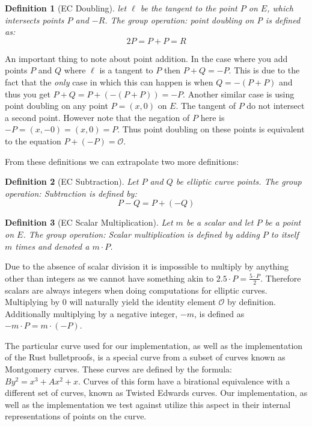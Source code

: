\documentclass{article}
\newtheorem{definition}{Definition}[section]
\renewcommand{\O}{\mathcal{O}}
\begin{document}
\begin{definition}[EC Doubling]
	let $\ell$ be the tangent to the point $P$ on $E$, which intersects
	points $P$ and $-R$. The group operation: point doubling on P is
	defined as:
	$$2P = P + P = R$$
\end{definition}

An important thing to note about point addition. In the case where
you add points $P$ and $Q$ where $\ell$ is a tangent to $P$ then $P +
Q = -P$. This is due to the fact that the \textit{only} case in which
this can happen is when $Q = -(P + P)$ and thus you get $P + Q = P +
(-(P + P)) = -P$. Another similar case is using point doubling on any
point $P = (x,0)$ on $E$. The tangent of $P$ do not intersect
a second point. However note that the negation of $P$ here is $-P =
(x,-0) = (x,0) = P$. Thus point doubling on these points is equivalent
to the equation $P + (-P) = \O$.

From these definitions we can extrapolate two more definitions:

\begin{definition}[EC Subtraction]
	Let $P$ and $Q$ be elliptic curve points. The group operation:
	Subtraction is defined by:
	$$P-Q = P + (-Q)$$
\end{definition}

\begin{definition}[EC Scalar Multiplication]
	Let $m$ be a scalar and let $P$ be a point on $E$. The group operation:
	Scalar multiplication is defined by adding $P$ to itself $m$ times and
	denoted a $m\cdot P$.
\end{definition}

Due to the absence of scalar division it is impossible to
multiply by anything other than integers as we cannot have something akin to $2.5 \cdot P = \frac{5\cdot P}{2}$. Therefore scalars are always integers when doing computations for elliptic curves. Multiplying by $0$ will
naturally yield the identity element $\mathcal{O}$ by definition.
Additionally multiplying by a negative integer, ${-m}$, is defined as
$-m\cdot P = m\cdot ({-P})$. 

The particular curve used for our implementation, as well as the
implementation of the Rust bulletproofs, is a special curve from a subset
of curves known as Montgomery curves. These curves are defined by the
formula: $By^2 = x^3 + Ax^2 + x$. Curves of this form have a birational
equivalence with a different set of curves, known as Twisted Edwards
curves. Our implementation, as well as the implementation we test against
utilize this aspect in their internal representations of points on the
curve.
\end{document}
